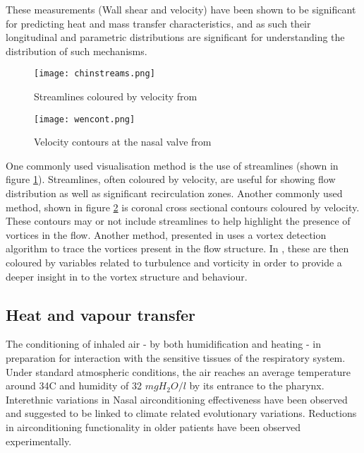 These measurements (Wall shear and velocity) have been shown to be significant for predicting heat and mass transfer characteristics\cite{Taylor2010}, and as such their longitudinal and parametric distributions are significant for understanding the distribution of such mechanisms. 

\begin{figure}
  \centering
  \texttt{[image: chinstreams.png]}
  \caption{Streamlines coloured by velocity from \cite{Tan2012}} \label{fig:chinstreams}
\centering
\end{figure}

\begin{figure}
  \centering
  \texttt{[image: wencont.png]}
  \caption{Velocity contours at the nasal valve from \cite{Wen2008}} \label{fig:wencont}
\centering
\end{figure}

One commonly used visualisation method is the use of streamlines (shown in figure \ref{fig:chinstreams}). Streamlines, often coloured by velocity\cite{Wen2008, Zhu2011, Garcia2007}, are useful for showing flow distribution as well as significant recirculation zones\cite{Lintermann2013, Xi2014}. Another commonly used method, shown in figure \ref{fig:wencont} is coronal cross sectional contours coloured by velocity. These contours may or not include streamlines to help highlight the presence of vortices in the flow\cite{Wen2008}. Another method, presented in \cite{Lintermann2013} uses a vortex detection algorithm to trace the vortices present in the flow structure. In \cite{Lintermann2013}, these are then coloured by variables related to turbulence and vorticity in order to provide a deeper insight in to the vortex structure and behaviour.

\subsection{Heat and vapour transfer}

The conditioning of inhaled air - by both humidification and heating - in preparation for interaction with the sensitive tissues of the respiratory system\cite{Elad2008}.
Under standard atmospheric conditions, the air reaches an average temperature around 34\degree C and humidity of 32 $mg H_2 O/l$ by its entrance to the pharynx\cite{Keck2000}.
Interethnic variations in Nasal airconditioning effectiveness have been observed and suggested to be linked to climate related evolutionary variations\cite{Noback2011, Yokley2009}.
Reductions in airconditioning functionality in older patients have been observed experimentally\cite{Lindemann2008}.

